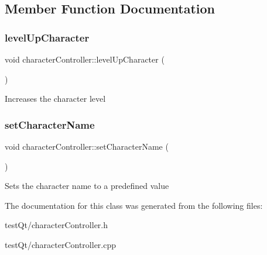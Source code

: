 \subsection{Member Function Documentation}
\hypertarget{classcharacter_controller_a70eba4e82bdb8795f21a96be2f742fa0}{}\label{classcharacter_controller_a70eba4e82bdb8795f21a96be2f742fa0} 
\subsubsection{\texorpdfstring{level\+Up\+Character}{levelUpCharacter}}
{\footnotesize\ttfamily void character\+Controller\+::level\+Up\+Character (\begin{DoxyParamCaption}{ }\end{DoxyParamCaption})\hspace{0.3cm}{\ttfamily [slot]}}

Increases the character level \hypertarget{classcharacter_controller_a4a3fa0e57a91c304be2adc2240041441}{}\label{classcharacter_controller_a4a3fa0e57a91c304be2adc2240041441} 
\subsubsection{\texorpdfstring{set\+Character\+Name}{setCharacterName}}
{\footnotesize\ttfamily void character\+Controller\+::set\+Character\+Name (\begin{DoxyParamCaption}{ }\end{DoxyParamCaption})\hspace{0.3cm}{\ttfamily [slot]}}

Sets the character name to a predefined value 

The documentation for this class was generated from the following files\+:\begin{DoxyCompactItemize}
\item 
test\+Qt/character\+Controller.\+h\item 
test\+Qt/character\+Controller.\+cpp\end{DoxyCompactItemize}
